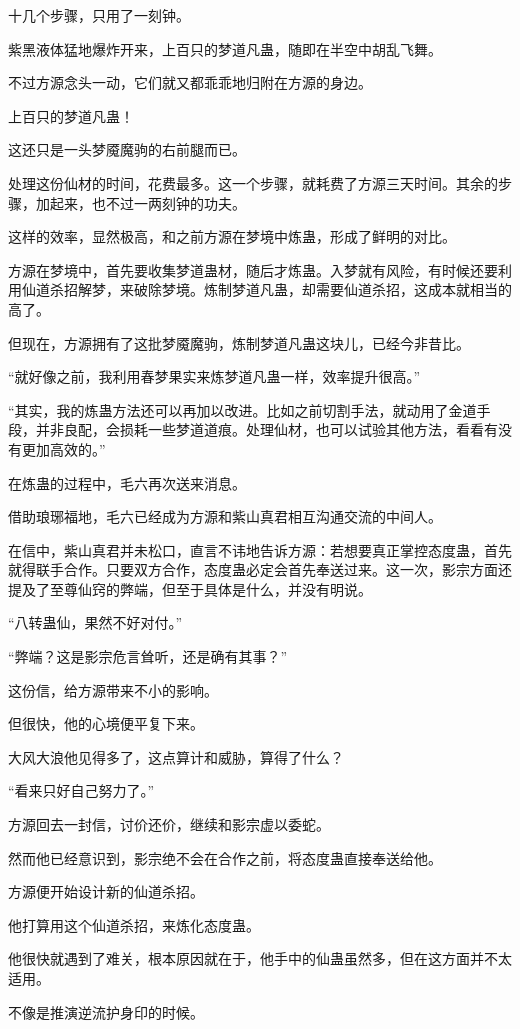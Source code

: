 \begin{this_body}
十几个步骤，只用了一刻钟。

紫黑液体猛地爆炸开来，上百只的梦道凡蛊，随即在半空中胡乱飞舞。

不过方源念头一动，它们就又都乖乖地归附在方源的身边。

上百只的梦道凡蛊！

这还只是一头梦魇魔驹的右前腿而已。

处理这份仙材的时间，花费最多。这一个步骤，就耗费了方源三天时间。其余的步骤，加起来，也不过一两刻钟的功夫。

这样的效率，显然极高，和之前方源在梦境中炼蛊，形成了鲜明的对比。

方源在梦境中，首先要收集梦道蛊材，随后才炼蛊。入梦就有风险，有时候还要利用仙道杀招解梦，来破除梦境。炼制梦道凡蛊，却需要仙道杀招，这成本就相当的高了。

但现在，方源拥有了这批梦魇魔驹，炼制梦道凡蛊这块儿，已经今非昔比。

“就好像之前，我利用春梦果实来炼梦道凡蛊一样，效率提升很高。”

“其实，我的炼蛊方法还可以再加以改进。比如之前切割手法，就动用了金道手段，并非良配，会损耗一些梦道道痕。处理仙材，也可以试验其他方法，看看有没有更加高效的。”

在炼蛊的过程中，毛六再次送来消息。

借助琅琊福地，毛六已经成为方源和紫山真君相互沟通交流的中间人。

在信中，紫山真君并未松口，直言不讳地告诉方源：若想要真正掌控态度蛊，首先就得联手合作。只要双方合作，态度蛊必定会首先奉送过来。这一次，影宗方面还提及了至尊仙窍的弊端，但至于具体是什么，并没有明说。

“八转蛊仙，果然不好对付。”

“弊端？这是影宗危言耸听，还是确有其事？”

这份信，给方源带来不小的影响。

但很快，他的心境便平复下来。

大风大浪他见得多了，这点算计和威胁，算得了什么？

“看来只好自己努力了。”

方源回去一封信，讨价还价，继续和影宗虚以委蛇。

然而他已经意识到，影宗绝不会在合作之前，将态度蛊直接奉送给他。

方源便开始设计新的仙道杀招。

他打算用这个仙道杀招，来炼化态度蛊。

他很快就遇到了难关，根本原因就在于，他手中的仙蛊虽然多，但在这方面并不太适用。

不像是推演逆流护身印的时候。


\end{this_body}
